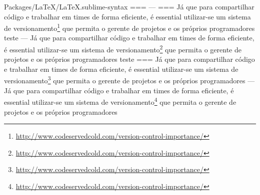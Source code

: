 Packages/LaTeX/LaTeX.sublime-syntax
===
---
===
Já que para compartilhar código e trabalhar em times de forma eficiente, é essential
utilizar\hyp{}se um sistema de
versionamento\footnote{\url{http://www.codeservedcold.com/version-control-importance/}} que permita
o gerente de projetos e os próprios programadores teste
---
Já que para compartilhar código e
trabalhar em times de forma eficiente,
é essential utilizar\hyp{}se um sistema de
versionamento\footnote{\url{http://www.codeservedcold.com/version-control-importance/}}
que permita o gerente de projetos e
os próprios programadores teste
===
Já que para compartilhar código e trabalhar em times de forma eficiente, é essential
utilizar\hyp{}se um sistema de
versionamento\footnote{\url{http://www.codeservedcold.com/version-control-importance/}} que permita
o gerente de projetos e os próprios programadores
---
Já que para compartilhar código e
trabalhar em times de forma eficiente,
é essential utilizar\hyp{}se um sistema de
versionamento\footnote{\url{http://www.codeservedcold.com/version-control-importance/}} que
permita o gerente de projetos e os próprios programadores
